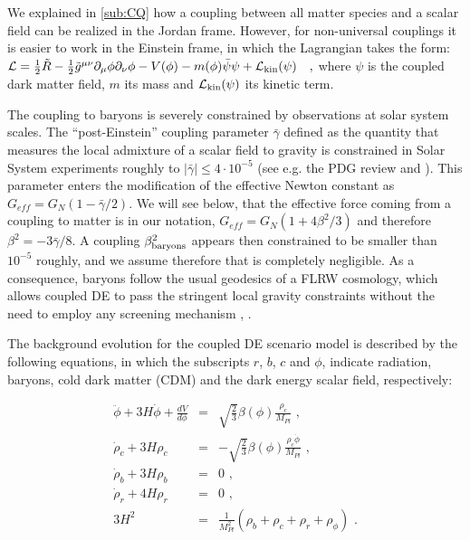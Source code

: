 We explained in \cref{sub:CQ} how a coupling between all matter species and a scalar field can be realized in the Jordan frame.
However, for non-universal couplings it is easier to work in the Einstein frame, in which the Lagrangian takes the form:
\beeqalsp$\label{eq:CDE-Lagrangian}
\mathcal{L} = \frac{1}{2} \tilde R - \frac{1}{2} \tilde{g}^{\mu \nu}  \partial_{\mu}\phi \partial_{\nu}\phi 
- V(\phi) - m(\phi) \bar{\psi} \psi + \mathcal{L}_{\rm kin}(\psi) \quad,
$
where $\psi$ is the coupled dark matter field, $m$ its mass and $\mathcal{L}_{\rm kin}(\psi)$
its kinetic term.

The coupling to baryons is severely constrained by observations at solar system scales.
The ``post-Einstein'' coupling parameter $\bar{\gamma}$ defined as the quantity that
measures the local admixture of a scalar field to gravity is
constrained in Solar System experiments  roughly to
$|\bar{\gamma}|\le4\cdot10^{-5}$ (see e.g. the PDG review \cite{Agashe:2014kda}
and \citep{Will_2005,Bertotti_Iess_Tortora_2003}). 
This parameter enters the modification
of the effective Newton constant as $G_{eff}=G_{N}(1-\bar{\gamma}/2)$. 
We will see below, that the effective force coming from a coupling to matter is
in our notation, $G_{eff}=G_{N}(1+4\beta^{2}/3)$
and therefore $\beta^{2}=-3\bar{\gamma}/8$. A coupling $\beta_{\rm baryons}^{2}$
appears then constrained to be smaller than $10^{-5}$ roughly, and
we assume therefore that is completely negligible. As a consequence,
baryons follow the usual geodesics of a FLRW cosmology, which allows
coupled DE to pass the stringent local gravity constraints without
the need to employ any screening mechanism \citep{2015arXiv150203888H}, 
.

The background evolution for the coupled DE scenario model is described
by the following equations, in which the subscripts $r$, $b$, $c$
and $\phi$, indicate radiation, baryons, cold dark matter (CDM) and
the dark energy scalar field, respectively:

\begin{eqnarray}
\ddot{\phi}+3H\dot{\phi}+\frac{dV}{d\phi} & = & \sqrt{\frac{2}{3}}\beta(\phi)\frac{\rho_{c}}{M_{Pl}}\,\,,\label{eq:quint-kleingordon}\\
\dot{\rho}_{c}+3H\rho_{c} & = & -\sqrt{\frac{2}{3}}\beta(\phi)\frac{\rho_{c}\dot{\phi}}{M_{Pl}}\,\,,\label{eq:cdm-back-density}\\
\dot{\rho}_{b}+3H\rho_{b} & = & 0\,\,,\\
\dot{\rho}_{r}+4H\rho_{r} & = & 0\,\,,\\
3H^{2} & = & \frac{1}{M_{Pl}^{2}}(\rho_{b}+\rho_{c}+\rho_{r}+\rho_{\phi})\,\,.
\end{eqnarray}


